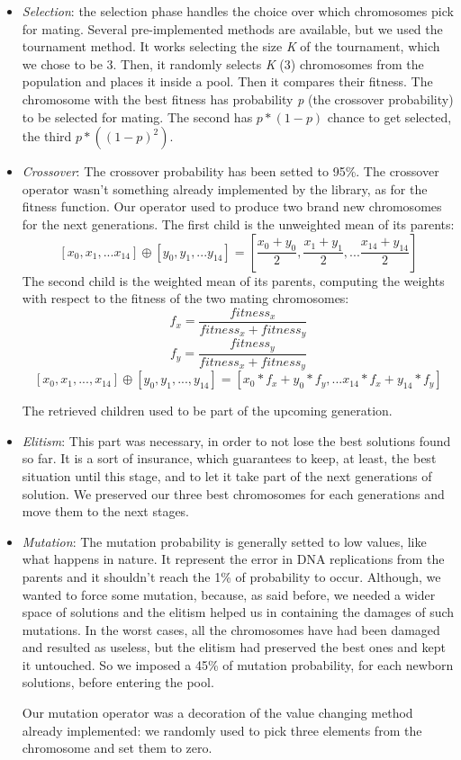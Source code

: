 \begin{itemize}
	\item[\PencilRight]\textit{Selection}: the selection phase handles the choice over which chromosomes pick for mating. Several pre-implemented methods are available, but we used the tournament method. It works selecting the size \textit{K} of the tournament, which we chose to be 3. Then, it randomly selects \textit{K} (3) chromosomes from the population and places it inside a pool. Then it compares their fitness. The chromosome with the best fitness has probability \textit{p} (the crossover probability) to be selected for mating. The second has $ p*(1-p) $ chance to get selected, the third $ p*((1-p)^{2}) $.
	\item[\PencilRight]\textit{Crossover}: The crossover probability has been setted to 95\%.
	The crossover operator wasn't something already implemented by the library, as for the fitness function. Our operator used to produce two brand new chromosomes for the next generations.
	The first child is the unweighted mean of its parents:
	\[ [x_{0}, x_{1}, ... x_{14}] \oplus [y_{0}, y_{1}, ... y_{14}] = [\frac{x_{0}+y_{0}}{2}, \frac{x_{1}+y_{1}}{2}, ... \frac{x_{14}+y_{14}}{2}]\]
	The second child is the weighted mean of its parents, computing the weights with respect to the fitness of the two mating chromosomes:
	\[ f_{x} = \frac{fitness_{x}}{fitness_{x}+fitness_{y}} \]
	\[ f_{y} = \frac{fitness_{y}}{fitness_{x}+fitness_{y}} \]
		\[ [x_{0}, x_{1}, ..., x_{14}] \oplus [y_{0}, y_{1}, ..., y_{14}] = [x_{0}*f_{x}+y_{0}*f_{y}, ... x_{14}*f_{x}+y_{14}*f_{y} ]\]
		
	The retrieved children used to be part of the upcoming generation.
	\item[\PencilRight]\textit{Elitism}: This part was necessary, in order to not lose the best solutions found so far. It is a sort of insurance, which guarantees to keep, at least, the best situation until this stage, and to let it take part of the next generations of solution. We preserved our three best chromosomes for each generations and move them to the next stages.
	\item[\PencilRight]\textit{Mutation}: The mutation probability is generally setted to low values, like what happens in nature. It represent the error in DNA replications from the parents and it shouldn't reach the 1\% of probability to occur.
	Although, we wanted to force some mutation, because, as said before, we needed a wider space of solutions and the elitism helped us in containing the damages of such mutations. In the worst cases, all the chromosomes have had been damaged and resulted as useless, but the elitism had preserved the best ones and kept it untouched. So we imposed a 45\% of mutation probability, for each newborn solutions, before entering the pool.
	
	Our mutation operator was a decoration of the value changing method already implemented: we randomly used to pick three elements from the chromosome and set them to zero.
\end{itemize}

